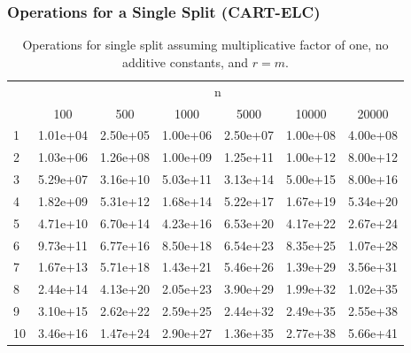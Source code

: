 \documentclass[10pt]{beamer}
\begin{document}
\begin{frame}
	\frametitle{Operations for a Single Split (CART-ELC)}

\begin{table}[h]
	\centering
	\footnotesize
    \caption{Operations for single split assuming multiplicative factor of one, no additive constants, and $r = m$.}
	\begin{tabular}{lcccccc} 
		\addlinespace
		\toprule
		\multirow{2}{*}{r} & \multicolumn{6}{c}{n}  \\ 
		\cmidrule(lr){2-7}  
		& 100 & 500 & 1000 & 5000 & 10000 & 20000 \\ 
		\midrule
			1 & 1.01e+04 & 2.50e+05 & 1.00e+06 & 2.50e+07 & 1.00e+08 & 4.00e+08 \\
			2 & 1.03e+06 & 1.26e+08 & 1.00e+09 & 1.25e+11 & 1.00e+12 & 8.00e+12 \\
			3 & 5.29e+07 & 3.16e+10 & 5.03e+11 & 3.13e+14 & 5.00e+15 & 8.00e+16 \\
			4 & 1.82e+09 & 5.31e+12 & 1.68e+14 & 5.22e+17 & 1.67e+19 & 5.34e+20 \\
			5 & 4.71e+10 & 6.70e+14 & 4.23e+16 & 6.53e+20 & 4.17e+22 & 2.67e+24 \\
			6 & 9.73e+11 & 6.77e+16 & 8.50e+18 & 6.54e+23 & 8.35e+25 & 1.07e+28 \\
			7 & 1.67e+13 & 5.71e+18 & 1.43e+21 & 5.46e+26 & 1.39e+29 & 3.56e+31 \\
			8 & 2.44e+14 & 4.13e+20 & 2.05e+23 & 3.90e+29 & 1.99e+32 & 1.02e+35 \\
			9 & 3.10e+15 & 2.62e+22 & 2.59e+25 & 2.44e+32 & 2.49e+35 & 2.55e+38 \\
			10 & 3.46e+16 & 1.47e+24 & 2.90e+27 & 1.36e+35 & 2.77e+38 & 5.66e+41 \\
		\bottomrule
	\end{tabular}
	\label{fig:operations}
\end{table}
\end{frame}
\end{document}

